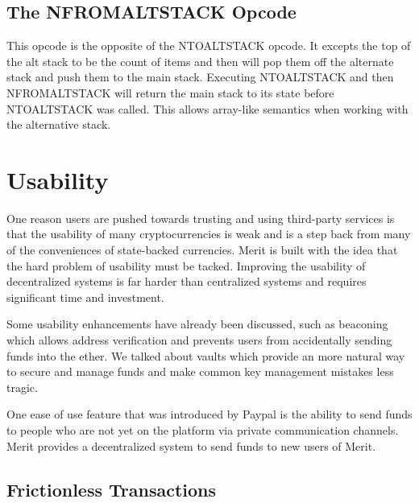 \documentclass{article}
\begin{document}
\subsection{The NFROMALTSTACK Opcode}

\begin{center}
\end{center}

This opcode is the opposite of the NTOALTSTACK opcode. It excepts the top of the
alt stack to be the count of items and then will pop them off the alternate stack
and push them to the main stack. Executing NTOALTSTACK and then NFROMALTSTACK will
return the main stack to its state before NTOALTSTACK was called. This allows
array-like semantics when working with the alternative stack.

\section{Usability}

One reason users are pushed towards trusting and using third-party services is that
the usability of many cryptocurrencies is weak and is a step back from many
of the conveniences of state-backed currencies. Merit is built with the idea
that the hard problem of usability must be tacked. Improving the usability of
decentralized systems is far harder than centralized systems and requires significant
time and investment.

Some usability enhancements have already been discussed, such as beaconing which
allows address verification and prevents users from accidentally sending funds into
the ether. We talked about vaults which provide an more natural way to secure and
manage funds and make common key management mistakes less tragic.

One ease of use feature that was introduced by Paypal is the ability to send
funds to people who are not yet on the platform via private communication channels.
Merit provides a decentralized system to send funds to new users of Merit.

\subsection{Frictionless Transactions}
\end{document}
